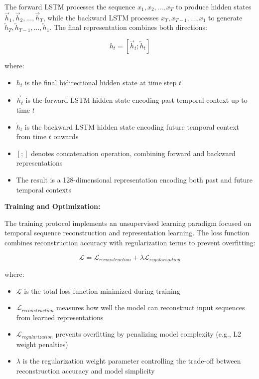 \documentclass[a4paper,12pt,twoside]{article}
\begin{document}
The forward LSTM processes the sequence $x_1, x_2, ..., x_T$ to produce hidden states $\overrightarrow{h}_1, \overrightarrow{h}_2, ..., \overrightarrow{h}_T$, while the backward LSTM processes $x_T, x_{T-1}, ..., x_1$ to generate $\overleftarrow{h}_T, \overleftarrow{h}_{T-1}, ..., \overleftarrow{h}_1$. The final representation combines both directions:

$$h_t = [\overrightarrow{h}_t; \overleftarrow{h}_t]$$

where:
\begin{itemize}
    \item $h_t$ is the final bidirectional hidden state at time step $t$
    \item $\overrightarrow{h}_t$ is the forward LSTM hidden state encoding past temporal context up to time $t$
    \item $\overleftarrow{h}_t$ is the backward LSTM hidden state encoding future temporal context from time $t$ onwards
    \item $[;]$ denotes concatenation operation, combining forward and backward representations
    \item The result is a 128-dimensional representation encoding both past and future temporal contexts
\end{itemize}

\textbf{Training and Optimization:}

The training protocol implements an unsupervised learning paradigm focused on temporal sequence reconstruction and representation learning. The loss function combines reconstruction accuracy with regularization terms to prevent overfitting:

$$\mathcal{L} = \mathcal{L}_{reconstruction} + \lambda \mathcal{L}_{regularization}$$

where:
\begin{itemize}
    \item $\mathcal{L}$ is the total loss function minimized during training
    \item $\mathcal{L}_{reconstruction}$ measures how well the model can reconstruct input sequences from learned representations
    \item $\mathcal{L}_{regularization}$ prevents overfitting by penalizing model complexity (e.g., L2 weight penalties)
    \item $\lambda$ is the regularization weight parameter controlling the trade-off between reconstruction accuracy and model simplicity
\end{itemize}
\end{document}
